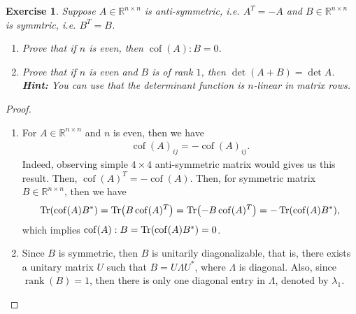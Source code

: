 \documentclass[11pt]{article}
\newtheorem{exercise}{Exercise}[section]
\theoremstyle{definition}
\numberwithin{equation}{subsection}
\begin{document}
\begin{exercise}
Suppose $A \in \mathbb{R}^{n \times n}$ is anti-symmetric, i.e. $A^T = - A$ and $B \in \mathbb{R}^{n \times n}$ is symmtric, i.e. $B^T = B$.
\begin{enumerate}[label=(\alph*)]
    \item Prove that if $n$ is even, then $\operatorname{cof}(A):B = 0$.
    
    \item Prove that if $n$ is even and $B$ is of rank $1$, then $\det(A + B) = \det A$. \\
    {\bf Hint:} You can use that the determinant function is $n$-linear in matrix rows.
\end{enumerate}
\end{exercise}
\begin{proof}
~\begin{enumerate}[label=(\alph*)]
    \item For $A \in \mathbb{R}^{n \times n}$ and $n$ is even, then we have
    \begin{align*}
        \operatorname{cof}(A)_{ij} = - \operatorname{cof}(A)_{ij}.
    \end{align*}
    Indeed, observing simple $4 \times 4$ anti-symmetric matrix would gives us this result. Then, $\operatorname{cof}(A)^T = - \operatorname{cof}(A)$. Then, for symmetric matrix $B \in \mathbb{R}^{n \times n}$, then we have
    \begin{align*}
        \Tr(\operatorname{cof}(A) B^*) = \Tr(B \operatorname{cof}(A)^T) = \Tr(- B \operatorname{cof}(A)^T) = - \Tr(\operatorname{cof}(A) B^*),
    \end{align*}
    which implies $\operatorname{cof}(A):B = \Tr(\operatorname{cof}(A) B^*) = 0$.
    
    \item Since $B$ is symmetric, then $B$ is unitarily diagonalizable, that is, there exists a unitary matrix $U$ such that $B = U \Lambda U^*$, where $\Lambda$ is diagonal. Also, since $\operatorname{rank}(B) = 1$, then there is only one diagonal entry in $\Lambda$, denoted by $\lambda_1$.
    

\end{enumerate}
\end{proof}
\end{document}
